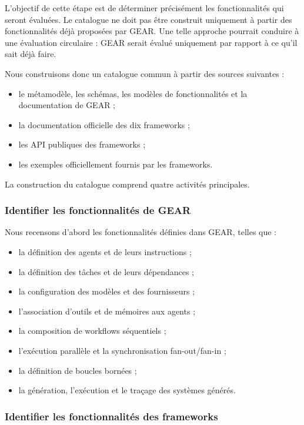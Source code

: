 L'objectif de cette étape est de déterminer précisément les
fonctionnalités qui seront évaluées. Le catalogue ne doit pas être
construit uniquement à partir des fonctionnalités déjà proposées par
GEAR. Une telle approche pourrait conduire à une évaluation circulaire :
GEAR serait évalué uniquement par rapport à ce qu'il sait déjà faire.

Nous construisons donc un catalogue commun à partir des sources
suivantes :

\begin{itemize}
    \item le métamodèle, les schémas, les modèles de fonctionnalités
    et la documentation de GEAR ;
    \item la documentation officielle des dix frameworks ;
    \item les API publiques des frameworks ;
    \item les exemples officiellement fournis par les frameworks.
\end{itemize}

La construction du catalogue comprend quatre activités principales.


\subsubsection{Identifier les fonctionnalités de GEAR}

Nous recensons d'abord les fonctionnalités définies dans GEAR, telles
que :

\begin{itemize}
    \item la définition des agents et de leurs instructions ;
    \item la définition des tâches et de leurs dépendances ;
    \item la configuration des modèles et des fournisseurs ;
    \item l'association d'outils et de mémoires aux agents ;
    \item la composition de workflows séquentiels ;
    \item l'exécution parallèle et la synchronisation fan-out/fan-in ;
    \item la définition de boucles bornées ;
    \item la génération, l'exécution et le traçage des systèmes
    générés.
\end{itemize}


\subsubsection{Identifier les fonctionnalités des frameworks}

